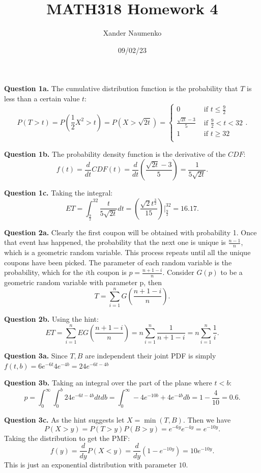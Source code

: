 \documentclass[letterpaper, reqno,11pt]{article}
\begin{document}
\title{MATH318 Homework 4}
\date{09/02/23}
\author{Xander Naumenko}
\maketitle

{\medskip\noindent\bf Question 1a.} The cumulative distribution function is the probability that $T$ is less than a certain value $t$: 
\[
P(T>t)=P(\frac{1}{2}X^2>t)=P(X>\sqrt{2t}) =\begin{cases}
    0&\text{ if }t\leq \frac{9}{2}\\
    \frac{\sqrt{2t}-3}{5} &\text{ if }\frac{9}{2}<t<32\\
    1&\text{ if }t\geq 32\\
\end{cases}
.\]

{\medskip\noindent\bf Question 1b.} The probability density function is the derivative of the $CDF$: 
\[
f(t)=\frac{d}{dt}CDF(t)=\frac{d}{dt}\left( \frac{\sqrt{2t} -3}{5} \right) =\frac{1}{5\sqrt{2t} }
.\]

{\medskip\noindent\bf Question 1c.} Taking the integral: 
\[
    ET=\int_{\frac{9}{2}}^{32} \frac{t}{5\sqrt{2t} }dt = \left( \frac{\sqrt{2}t ^{\frac{3}{2}}}{15}  \right) \bigg|_{\frac{9}{2}}^{32}=16.17
.\]

{\medskip\noindent\bf Question 2a.} Clearly the first coupon will be obtained with probability 1. Once that event has happened, the probability that the next one is unique is $\frac{n-1}{n}$, which is a geometric random variable. This process repeats until all the unique coupons have been picked. The parameter of each random variable is the probability, which for the $i$th coupon is $p=\frac{n+1-i}{n}$. Consider $G(p)$ to be a geometric random variable with parameter p, then
\[
T=\sum_{i=1}^{n}G(\frac{n+1-i}{n})
.\]

{\medskip\noindent\bf Question 2b.} Using the hint: 
\[
    ET=\sum_{i=1}^{n}EG(\frac{n+1-i}{n})=n\sum_{i=1}^{n}\frac{1}{n+1-i}=n\sum_{i=1}^{n}\frac{1}{i}
.\]

{\medskip\noindent\bf Question 3a.} Since $T,B$ are independent their joint PDF is simply $f(t,b)=6e^{-6t}4e^{-4b}= 24 e^{-6t-4b }$

{\medskip\noindent\bf Question 3b.} Taking an integral over the part of the plane where $t<b$: 
\[
p=\int_0^{\infty}\int_0^{b}24e^{-6t-4b}dtdb=\int_0^\infty -4e^{-10b}+4e^{-4b}db=1-\frac{4}{10}=0.6
.\]

{\medskip\noindent\bf Question 3c.} As the hint suggests let $X=\min(T,B)$. Then we have 
\[
P(X>y)=P(T>y)P(B>y)=e^{-6y}e^{-4y}=e^{-10y}
.\]
Taking the distribution to get the PMF: 
\[
f(y)=\frac{d}{dy}P(X<y)=\frac{d}{dy}(1-e^{-10y})=10e^{-10y}
.\]
This is just an exponential distribution with parameter $10$. 
\end{document}
